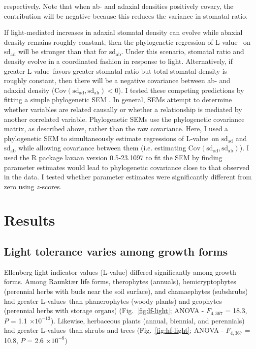 \documentclass[12pt, oneside]{article}
\newcommand{\pkg}[1]{{\fontseries{b}\selectfont #1}}
\newcommand{\el}{L-value}
\newcommand{\els}{L-values}
\begin{document}
respectively. Note that when ab- and adaxial densities positively covary, the contribution will be negative because this reduces the variance in stomatal ratio.

If light-mediated increases in adaxial stomatal density can evolve while abaxial density remains roughly constant, then the phylogenetic regression of \el~ on $\mathrm{sd_{ad}}$ will be stronger than that for $\mathrm{sd_{ab}}$. Under this scenario, stomatal ratio and density evolve in a coordinated fashion in response to light. Alternatively, if greater \el~favors greater stomatal ratio but total stomatal density is roughly constant, then there will be a negative covariance between ab- and adaxial density ($\mathrm{Cov(sd_{ad}, sd_{ab}) < 0}$). I tested these competing predictions by fitting a simple phylogenetic SEM \citep[see][for a similar approach]{Mason_etal_2016}. In general, SEMs attempt to determine whether variables are related causally or whether a relationship is mediated by another correlated variable. Phylogenetic SEMs use the phylogenetic covariance matrix, as described above, rather than the raw covariance. Here, I used a phylogenetic SEM to simultaneously estimate regressions of \el~on $\mathrm{sd_{ad}}$ and $\mathrm{sd_{ab}}$ while allowing covariance between them (i.e. estimating $\mathrm{Cov(sd_{ad}, sd_{ab})}$). I used the R package \pkg{lavaan} version 0.5-23.1097 \citep{Rosseel_2012} to fit the SEM by finding parameter estimates would lead to phylogenetic covariance close to that observed in the data. I tested whether parameter estimates were significantly different from zero using $z$-scores.


\section*{Results}

\subsection*{Light tolerance varies among growth forms}

Ellenberg light indicator values (\el) differed significantly among growth forms. Among Raunki\ae r life forms, therophytes (annuals), hemicryptophytes (perennial herbs with buds near the soil surface), and chamaephytes (subshrubs) had greater \els~than phanerophytes (woody plants) and geophytes (perennial herbs with storage organs) (Fig.~\ref{fig:lf-light}; ANOVA - $F_{4, 367}$ = 18.3, $P$ = 1.1 $\times10^{-13}$). Likewise, herbaceous plants (annual, biennial, and perennials) had greater \els~than shrubs and trees (Fig.~\ref{fig:hf-light}; ANOVA - $F_{4, 367}$ = 10.8, $P$ = 2.6 $\times10^{-8}$)
\end{document}
